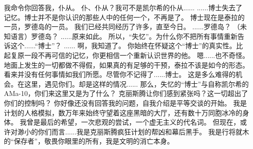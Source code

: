 \documentclass[openany]{book}
\begin{document}
\begin{dialogue}
     我命令你回答我，仆从。
     仆、仆从？我可不是凯尔希的仆从......
     ......博士失去了记忆。博士并不是你认识的那些人中的任何一个，不再是了。
     博士现在是泰拉的一员，罗德岛的一员。
     我们已经共同经历了许多，直至今日。
     ......罗德岛？
     （未知语言）罗德岛？
     ......原来如此。
     所以，“失忆”。为什么你不把所有事情重新告诉这个......“博士”？
     ......
     啊，我知道了。
     你始终在怀疑这个“博士”的真实性。比起复原一段不再可信的记忆，你更相信一个重新认识世界的他。
     嗯......也不奇怪。地面上发生的一切都做不得假，如果真的有足够的干预，泰拉不该是如今的形态。
     看来并没有任何事情如我们所愿。尽管你不记得了......博士。
     这是多么难得的机会。在这里，遇见你们。却是这样的情况......
     那么，失忆的“博士”与自称凯尔希的AMa-10，你们来这里又是为了什么？
     克丽斯腾让你们感到紧张吗？这一切超出了你们的控制吗？
     你好像还没有回答我的问题，自我介绍是平等交谈的开始。
     我是计划的人格模拟，数万年来始终守望着这座黑暗的大厅，还有数十万同胞冰冷的身体。
     我曾是最后的希望，一次悲观的尝试，一个虚无主义的代名词。
     但现在，或许对渺小的你们而言......我是克丽斯腾疯狂计划的帮凶和幕后黑手。
     我是行将就木的“保存者”，敬畏你眼里的所有，我是文明的消亡本身。
\end{dialogue}
\end{document}
